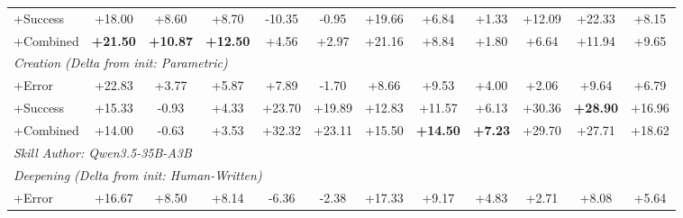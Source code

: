 \begin{table}[t]
{\begin{tabular}{@{}l ccccc ccccc c@{}}
\quad\quad +Success
    & \cellcolor{Green3!47}+18.00 & \cellcolor{Green3!47}+8.60 & \cellcolor{Green3!42}+8.70 & \cellcolor{Red1!11}-10.35 & \cellcolor{Red1!2}-0.95 & \cellcolor{Green3!44}+19.66 & \cellcolor{Green3!28}+6.84 & \cellcolor{Green3!11}+1.33 & \cellcolor{Green3!17}+12.09 & \cellcolor{Green3!37}+22.33 & \cellcolor{Green3!26}+8.15 \\
\quad\quad +Combined
    & \cellcolor{Green3!57}\textbf{+21.50} & \cellcolor{Green3!60}\textbf{+10.87} & \cellcolor{Green3!60}\textbf{+12.50} & \cellcolor{Green3!5}+4.56 & \cellcolor{Green3!6}+2.97 & \cellcolor{Green3!47}+21.16 & \cellcolor{Green3!37}+8.84 & \cellcolor{Green3!15}+1.80 & \cellcolor{Green3!9}+6.64 & \cellcolor{Green3!20}+11.94 & \cellcolor{Green3!31}+9.65 \\[2pt]
\multicolumn{12}{l}{\quad\textit{Creation (Delta from init: Parametric)}} \\
\quad\quad +Error
    & \cellcolor{Green3!60}+22.83 & \cellcolor{Green3!21}+3.77 & \cellcolor{Green3!28}+5.87 & \cellcolor{Green3!8}+7.89 & \cellcolor{Red1!4}-1.70 & \cellcolor{Green3!19}+8.66 & \cellcolor{Green3!39}+9.53 & \cellcolor{Green3!33}+4.00 & \cellcolor{Green3!3}+2.06 & \cellcolor{Green3!16}+9.64 & \cellcolor{Green3!22}+6.79 \\
\quad\quad +Success
    & \cellcolor{Green3!40}+15.33 & \cellcolor{Red1!5}-0.93 & \cellcolor{Green3!21}+4.33 & \cellcolor{Green3!25}+23.70 & \cellcolor{Green3!42}+19.89 & \cellcolor{Green3!29}+12.83 & \cellcolor{Green3!48}+11.57 & \cellcolor{Green3!51}+6.13 & \cellcolor{Green3!42}+30.36 & \cellcolor{Green3!48}\textbf{+28.90} & \cellcolor{Green3!55}+16.96 \\
\quad\quad +Combined
    & \cellcolor{Green3!37}+14.00 & \cellcolor{Red1!3}-0.63 & \cellcolor{Green3!17}+3.53 & \cellcolor{Green3!34}+32.32 & \cellcolor{Green3!49}+23.11 & \cellcolor{Green3!34}+15.50 & \cellcolor{Green3!60}\textbf{+14.50} & \cellcolor{Green3!60}\textbf{+7.23} & \cellcolor{Green3!41}+29.70 & \cellcolor{Green3!46}+27.71 & \cellcolor{Green3!60}+18.62 \\[2pt]
\midrule
\multicolumn{12}{l}{\textit{Skill Author: Qwen3.5-35B-A3B}} \\[2pt]
\multicolumn{12}{l}{\quad\textit{Deepening (Delta from init: Human-Written)}} \\
\quad\quad +Error
    & \cellcolor{Green3!44}+16.67 & \cellcolor{Green3!47}+8.50 & \cellcolor{Green3!39}+8.14 & \cellcolor{Red1!7}-6.36 & \cellcolor{Red1!5}-2.38 & \cellcolor{Green3!39}+17.33 & \cellcolor{Green3!38}+9.17 & \cellcolor{Green3!40}+4.83 & \cellcolor{Green3!4}+2.71 & \cellcolor{Green3!13}+8.08 & \cellcolor{Green3!18}+5.64 \\

\end{tabular}}
\end{table}
